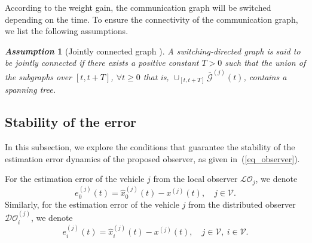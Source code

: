 \documentclass[letterpaper, 10pt, conference]{ieeeconf}  %
\def\eqref#1{(\ref{#1})}
\def\V{\mathcal{V}} %
\def\G{\mathcal{G}} %
\def\LO{\mathcal{LO}} %
\def\DO{\mathcal{DO}} %
\newtheorem{assumption}{\it Assumption}%
\begin{document}
According to the weight gain, the communication graph will be switched depending on the time. To ensure the connectivity of the communication graph, we list the following assumptions.


\begin{assumption}[Jointly connected graph \cite{hao2024eventtriggered,liu2021discretetime}]
\label{ass_graph}
A switching-directed graph is said to be jointly connected if there exists a positive constant $T > 0$ such that the union of the subgraphs over $[t, t+ T]$, $\forall t \geq 0$ that is, $\cup _{[t, t+ T]}\bar{\G}^{(j)}(t)$, contains a spanning tree.
\end{assumption}


\subsection{Stability of the error }
\label{subsec_Prove}

In this subsection, we explore the conditions that guarantee the stability of the
estimation error dynamics of the proposed observer, as given in~\eqref{eq_observer}.

For the estimation error of the vehicle $j$ from the local observer $\LO_{j}$, we denote
\begin{equation}
    e_0^{(j)}(t) = \hat{x}_0^{(j)}(t) - x^{(j)}(t), \quad j \in \V. 
\end{equation}
Similarly, for the estimation error of the vehicle $j$ from the distributed observer $\DO_{i}^{(j)}$, we denote
\begin{equation}
    e_i^{(j)}(t) = \hat{x}_i^{(j)}(t) - x^{(j)}(t), \quad j \in \V, \ i \in {\V}.
\end{equation}
\end{document}
